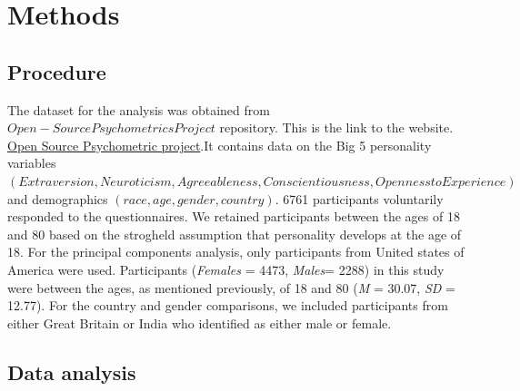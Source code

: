 \documentclass[
  english,
  man]{apa6}
\begin{document}
\hypertarget{methods}{%
\section{Methods}\label{methods}}

\hypertarget{procedure}{%
\subsection{Procedure}\label{procedure}}

The dataset for the analysis was obtained from \(Open-Source Psychometrics Project\) repository. This is the link to the website. \href{https://openpsychometrics.org/_rawdata/}{Open Source Psychometric project}.It contains data on the Big 5 personality variables \((Extraversion, Neuroticism, Agreeableness, Conscientiousness, Openness to Experience)\) and demographics \((race, age, gender, country)\). 6761 participants voluntarily responded to the questionnaires. We retained participants between the ages of 18 and 80 based on the strogheld assumption that personality develops at the age of 18. For the principal components analysis, only participants from United states of America were used. Participants (\emph{Females} = 4473, \emph{Males}= 2288) in this study were between the ages, as mentioned previously, of 18 and 80 (\emph{M} = 30.07, \emph{SD} = 12.77).
For the country and gender comparisons, we included participants from either Great Britain or India who identified as either male or female.

\hypertarget{data-analysis}{%
\subsection{Data analysis}\label{data-analysis}}
\end{document}
